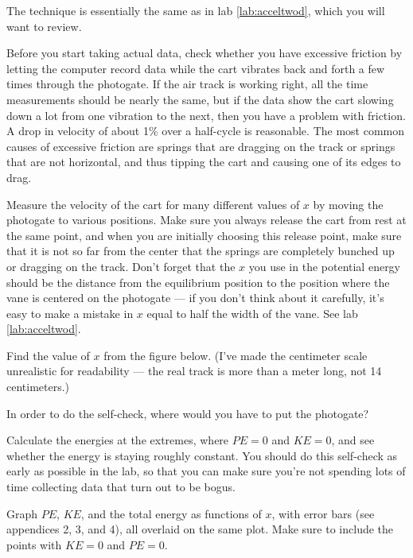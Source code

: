 \observations

The technique is essentially the same as in lab \ref{lab:acceltwod}, which you will want
to review.

Before you start taking actual data, check whether you have
excessive friction by letting the computer record data while
the cart vibrates back and forth a few times through the
photogate. If the air track is working right, all the time
measurements should be nearly the same, but if the data show
the cart slowing down a lot from one vibration to the next,
then you have a problem with friction. A drop in velocity of
about 1\% over a half-cycle is reasonable. The most common
causes of excessive friction are springs that are dragging
on the track or springs that are not horizontal, and thus
tipping the cart and causing one of its edges to drag.

Measure the velocity of the cart for many different values
of $x$ by moving the photogate to various positions. Make
sure you always release the cart from rest at the same
point, and when you are initially choosing this release
point, make sure that it is not so far from the center that
the springs are completely bunched up or dragging on the
track. Don't forget that the $x$ you use in the potential
energy should be the distance from the equilibrium position
to the position where the vane is centered on the photogate
--- if you don't think about it carefully, it's easy to make
a mistake in $x$ equal to half the width of the vane.
See lab \ref{lab:acceltwod}.

\prelab

\prelabquestion Find the value of $x$ from the figure below. (I've made the
centimeter scale unrealistic for readability --- the real track is
more than a meter long, not 14 centimeters.)

\prelabquestion In order to do the self-check, where would you have
to put the photogate?


\selfcheck

Calculate the energies at the extremes, where $PE=0$ and
$KE=0$, and see whether the energy is staying roughly constant.
You should do this self-check as early as possible in the lab, so that
you can make sure you're not spending lots of time collecting data
that turn out to be bogus.

\analysis

Graph $PE$, $KE$, and the total energy as functions of $x$,
with error bars (see appendices 2, 3, and 4), all overlaid
on the same plot. Make sure to include the points with $KE=0$ and
$PE=0$.

